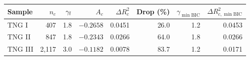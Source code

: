 \begin{tabular}{lrrrrrrr}
\toprule
Sample & $n_c$ & $\gamma_{\rm f}$ & $A_c$ & $\Delta R^2_c$ & Drop (\%) & $\gamma_{\min\mathrm{BIC}}$ & $\Delta R^2_{c,\min\mathrm{BIC}}$ \\
\midrule
TNG I & 407 & 1.8 & $-0.2658$ & 0.0451 & 26.0 & 1.2 & 0.0453 \\
TNG II & 847 & 1.8 & $-0.2343$ & 0.0266 & 64.0 & 1.8 & 0.0266 \\
TNG III & 2,117 & 3.0 & $-0.1182$ & 0.0078 & 83.7 & 1.2 & 0.0171 \\
\bottomrule
\end{tabular}
